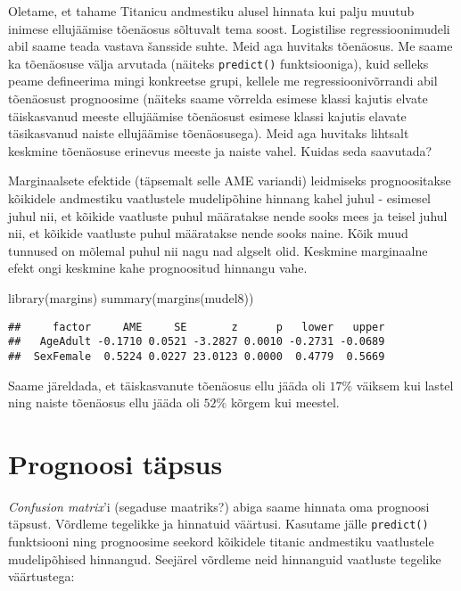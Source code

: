 \documentclass[
]{book}
\newenvironment{Shaded}{\begin{snugshade}}{\end{snugshade}}
\newcommand{\FunctionTok}[1]{\textcolor[rgb]{0.00,0.00,0.00}{#1}}
\newcommand{\NormalTok}[1]{#1}
\begin{document}
Oletame, et tahame Titanicu andmestiku alusel hinnata kui palju muutub inimese ellujäämise tõenäosus sõltuvalt tema soost. Logistilise regressioonimudeli abil saame teada vastava šansside suhte. Meid aga huvitaks tõenäosus. Me saame ka tõenäosuse välja arvutada (näiteks \texttt{predict()} funktsiooniga), kuid selleks peame defineerima mingi konkreetse grupi, kellele me regressioonivõrrandi abil tõenäosust prognoosime (näiteks saame võrrelda esimese klassi kajutis elvate täiskasvanud meeste ellujäämise tõenäosust esimese klassi kajutis elavate täsikasvanud naiste ellujäämise tõenäosusega). Meid aga huvitaks lihtsalt keskmine tõenäosuse erinevus meeste ja naiste vahel. Kuidas seda saavutada?

Marginaalsete efektide (täpsemalt selle AME variandi) leidmiseks prognoositakse kõikidele andmestiku vaatlustele mudelipõhine hinnang kahel juhul - esimesel juhul nii, et kõikide vaatluste puhul määratakse nende sooks mees ja teisel juhul nii, et kõikide vaatluste puhul määratakse nende sooks naine. Kõik muud tunnused on mõlemal puhul nii nagu nad algselt olid. Keskmine marginaalne efekt ongi keskmine kahe prognoositud hinnangu vahe.

\begin{Shaded}
\begin{Highlighting}[]
\FunctionTok{library}\NormalTok{(margins)}
\FunctionTok{summary}\NormalTok{(}\FunctionTok{margins}\NormalTok{(mudel8))}
\end{Highlighting}
\end{Shaded}

\begin{verbatim}
##     factor     AME     SE       z      p   lower   upper
##   AgeAdult -0.1710 0.0521 -3.2827 0.0010 -0.2731 -0.0689
##  SexFemale  0.5224 0.0227 23.0123 0.0000  0.4779  0.5669
\end{verbatim}

Saame järeldada, et täiskasvanute tõenäosus ellu jääda oli \(17\%\) väiksem kui lastel ning naiste tõenäosus ellu jääda oli \(52\%\) kõrgem kui meestel.

\hypertarget{prognoosi-tuxe4psus}{%
\section{Prognoosi täpsus}\label{prognoosi-tuxe4psus}}

\emph{Confusion matrix}'i (segaduse maatriks?) abiga saame hinnata oma prognoosi täpsust. Võrdleme tegelikke ja hinnatuid väärtusi. Kasutame jälle \texttt{predict()} funktsiooni ning prognoosime seekord kõikidele titanic andmestiku vaatlustele mudelipõhised hinnangud. Seejärel võrdleme neid hinnanguid vaatluste tegelike väärtustega:
\end{document}
